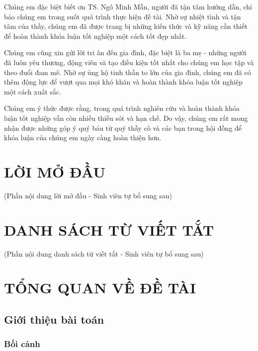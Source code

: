 \documentclass[12pt,a4paper]{report}
\begin{document}
Chúng em đặc biệt biết ơn TS. Ngô Minh Mẫn, người đã tận tâm hướng dẫn, chỉ bảo chúng em trong suốt quá trình thực hiện đề tài. Nhờ sự nhiệt tình và tận tâm của thầy, chúng em đã được trang bị những kiến thức và kỹ năng cần thiết để hoàn thành khóa luận tốt nghiệp một cách tốt đẹp nhất.

Chúng em cũng xin gửi lời tri ân đến gia đình, đặc biệt là ba mẹ - những người đã luôn yêu thương, động viên và tạo điều kiện tốt nhất cho chúng em học tập và theo đuổi đam mê. Nhờ sự ủng hộ tinh thần to lớn của gia đình, chúng em đã có thêm động lực để vượt qua mọi khó khăn và hoàn thành khóa luận tốt nghiệp một cách xuất sắc.

Chúng em ý thức được rằng, trong quá trình nghiên cứu và hoàn thành khóa luận tốt nghiệp vẫn còn nhiều thiếu sót và hạn chế. Do vậy, chúng em rất mong nhận được những góp ý quý báu từ quý thầy cô và các bạn trong hội đồng để khóa luận của chúng em ngày càng hoàn thiện hơn.

\chapter*{LỜI MỞ ĐẦU}
(Phần nội dung lời mở đầu - Sinh viên tự bổ sung sau)

\chapter*{DANH SÁCH TỪ VIẾT TẮT}
(Phần nội dung danh sách từ viết tắt - Sinh viên tự bổ sung sau)

\tableofcontents
\listoffigures
\listoftables

\clearpage
{} %

\chapter{TỔNG QUAN VỀ ĐỀ TÀI}
\section{Giới thiệu bài toán}
\subsection{Bối cảnh}
\end{document}
